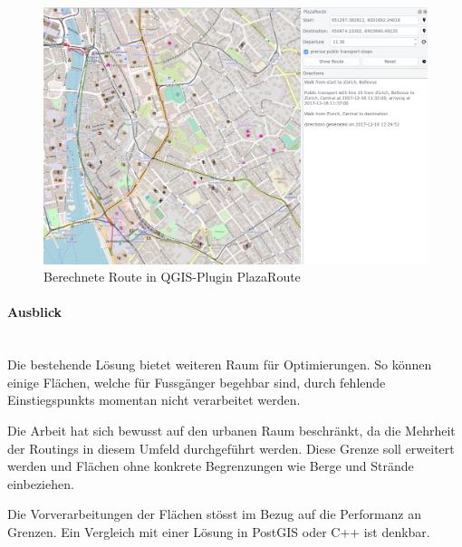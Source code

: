\begin{figure}[H]
    \centering
    \includegraphics[width=1.0\linewidth]{technicalreport/img/qgis_plugin_plaza_route_cropped}
    \caption[Berechnete Route in QGIS-Plugin PlazaRoute]{Berechnete Route in QGIS-Plugin PlazaRoute}
    \label{fig:qgis_plugin_plaza_route_cropped}
\end{figure}

\paragraph{Ausblick}~\\
Die bestehende Lösung bietet weiteren Raum für Optimierungen. So können einige Flächen, welche für Fussgänger begehbar sind, durch fehlende \glspl{Einstiegspunkt} momentan nicht verarbeitet werden.

Die Arbeit hat sich bewusst auf den urbanen Raum beschränkt, da die Mehrheit der Routings in diesem Umfeld durchgeführt werden. Diese Grenze soll erweitert werden und Flächen ohne konkrete Begrenzungen wie Berge und Strände einbeziehen.

Die Vorverarbeitungen der Flächen stösst im Bezug auf die Performanz an Grenzen. Ein Vergleich mit einer Lösung in PostGIS oder C++ ist denkbar.